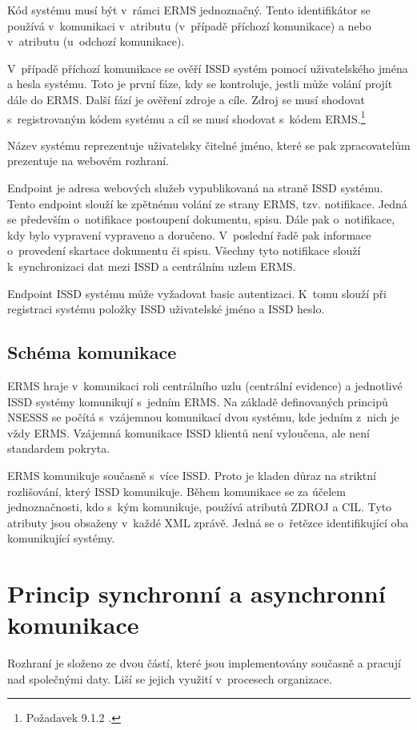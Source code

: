 \documentclass[
  master,
  field=ainfp,
  biblatex,
  language=czech,
  glossaries,
  theorems=false,
  index
]{kidiplom}
\begin{document}
Kód systému musí být v~rámci ERMS jednoznačný. Tento identifikátor se používá v~komunikaci v~atributu  (v~případě příchozí komunikace) a nebo v~atributu  (u~odchozí komunikace).

V~případě příchozí komunikace se ověří ISSD systém pomocí uživatelského jména a hesla systému. Toto je první fáze, kdy se kontroluje, jestli může volání projít dále do ERMS. Další fází je ověření zdroje a cíle. Zdroj se musí shodovat s~registrovaným kódem systému a cíl se musí shodovat s~kódem ERMS.\footnote{Požadavek 9.1.2 \cite[s.~59]{o00}.}

Název systému reprezentuje uživatelsky čitelné jméno, které se pak zpracovatelům prezentuje na webovém rozhraní.

Endpoint je adresa webových služeb vypublikovaná na straně ISSD systému. Tento endpoint slouží ke zpětnému volání ze strany ERMS, tzv. notifikace. Jedná se především o~notifikace postoupení dokumentu, spisu. Dále pak o~notifikace, kdy bylo vypravení vypraveno a doručeno. V~poslední řadě pak informace o~provedení skartace dokumentu či spisu. Všechny tyto notifikace slouží k~synchronizaci dat mezi ISSD a centrálním uzlem ERMS.

Endpoint ISSD systému může vyžadovat basic autentizaci. K~tomu slouží při registraci systému položky ISSD uživatelské jméno a ISSD heslo.

\subsection{Schéma komunikace}
ERMS hraje v~komunikaci roli centrálního uzlu (centrální evidence) a jednotlivé ISSD systémy komunikují s~jedním ERMS. Na základě definovaných principů NSESSS se počítá s~vzájemnou komunikací dvou systému, kde jedním z~nich je vždy ERMS. Vzájemná komunikace ISSD klientů není vyloučena, ale není standardem pokryta. 

ERMS komunikuje současně s~více ISSD. Proto je kladen důraz na striktní rozlišování, který ISSD komunikuje. Během komunikace se za účelem jednoznačnosti, kdo s~kým komunikuje, používá atributů ZDROJ a CIL. Tyto atributy jsou obsaženy v~každé XML zprávě. Jedná se o~řetězce identifikující oba komunikující systémy.

\newpage
\section{Princip synchronní a asynchronní komunikace}
Rozhraní je složeno ze dvou částí, které jsou implementovány současně a pracují nad společnými daty. Liší se jejich využití v~procesech organizace.
\end{document}
